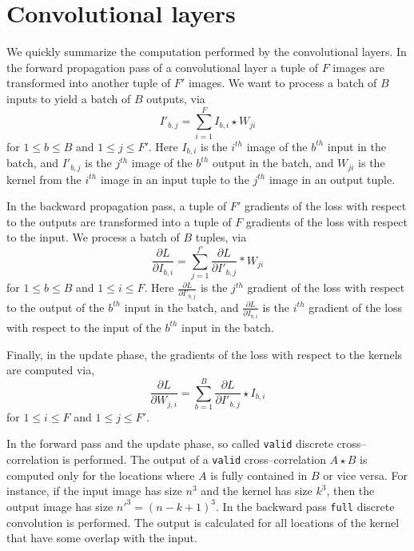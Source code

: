 \section{Convolutional layers} \label{sec-conv-layers}

  We quickly summarize the computation performed by the convolutional
  layers.  In the forward propagation pass of a convolutional layer a
  tuple of $F$ images are transformed into another tuple of $F'$
  images.  We want to process a batch of $B$ inputs to yield a batch
  of $B$ outputs, via
  \[
  I'_{b,j} = \sum_{i=1}^F I_{b,i} \star W_{ji}
  \]
  for $1 \le b \le B$ and $1 \le j \le F'$.  Here $I_{b,i}$ is the
  $i^{th}$ image of the $b^{th}$ input in the batch, and $I'_{b,j}$ is
  the $j^{th}$ image of the $b^{th}$ output in the batch, and $W_{ji}$
  is the kernel from the $i^{th}$ image in an input tuple to the
  $j^{th}$ image in an output tuple.

  In the backward propagation pass, a tuple of $F'$ gradients of the
  loss with respect to the outputs are transformed into a tuple of $F$
  gradients of the loss with respect to the input.  We process a batch
  of $B$ tuples, via
  \[
  \frac{\partial L}{\partial I_{b,i}} = \sum_{j=1}^{f'}
  \frac{\partial L}{\partial I'_{b,j}} \ast W_{ji}
  \]
  for $1 \le b \le B$ and $1 \le i \le F$.  Here $\frac{\partial
    L}{\partial I'_{b,j}}$ is the $j^{th}$ gradient of the loss with
  respect to the output of the $b^{th}$ input in the batch, and
  $\frac{\partial L}{\partial I_{b,i}}$ is the $i^{th}$ gradient of
  the loss with respect to the input of the $b^{th}$ input in the
  batch.

  Finally, in the update phase, the gradients of the loss with respect
  to the kernels are computed via,
  \[
  \frac{\partial L}{\partial W_{j,i}} = \sum_{b=1}^B
  \frac{\partial L}{\partial I'_{b,j}}  \star I_{b,i}
  \]
  for $1 \le i \le F$ and $1 \le j \le F'$.

  In the forward pass and the update phase, so called \texttt{valid}
  discrete cross--correlation is performed.  The output of a
  \texttt{valid} cross--correlation $A \star B$ is computed only for
  the locations where $A$ is fully contained in $B$ or vice versa.
  For instance, if the input image has size $n^3$ and the kernel has
  size $k^3$, then the output image has size $n'^3 = (n-k+1)^3$.  In
  the backward pass \texttt{full} discrete convolution is performed.
  The output is calculated for all locations of the kernel that have
  some overlap with the input.

